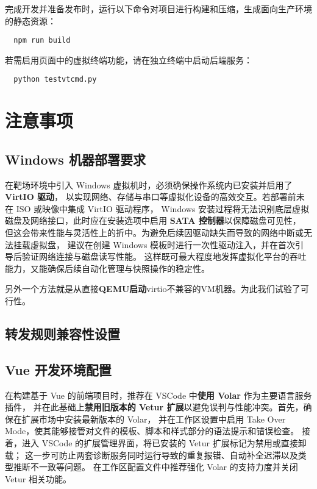 \documentclass[lang=cn,10pt]{elegantbook}
\begin{document}
完成开发并准备发布时，运行以下命令对项目进行构建和压缩，生成面向生产环境的静态资源：
\begin{verbatim}
  npm run build
\end{verbatim}

若需启用页面中的虚拟终端功能，请在独立终端中启动后端服务：
\begin{verbatim}
  python testvtcmd.py
\end{verbatim}





\section{注意事项}

\subsection{Windows 机器部署要求}
在靶场环境中引入 Windows 虚拟机时，必须确保操作系统内已安装并启用了 \textbf{VirtIO 驱动}，
以实现网络、存储与串口等虚拟化设备的高效交互。若部署前未在 ISO 或映像中集成 VirtIO 驱动程序，
Windows 安装过程将无法识别底层虚拟磁盘及网络接口，此时应在安装选项中启用 \textbf{SATA 控制器}以保障磁盘可见性，
但这会带来性能与灵活性上的折中。为避免后续因驱动缺失而导致的网络中断或无法挂载虚拟盘，
建议在创建 Windows 模板时进行一次性驱动注入，并在首次引导后验证网络连接与磁盘读写性能。
这样既可最大程度地发挥虚拟化平台的吞吐能力，又能确保后续自动化管理与快照操作的稳定性。

另外一个方法就是从直接\textbf{QEMU启动}virtio不兼容的VM机器。为此我们试验了可行性。

\subsection{转发规则兼容性设置}

\subsection{Vue 开发环境配置}
在构建基于 Vue 的前端项目时，推荐在 VSCode 中\textbf{使用 Volar} 作为主要语言服务插件，
并在此基础上\textbf{禁用旧版本的 Vetur 扩展}以避免误判与性能冲突。首先，确保在扩展市场中安装最新版本的 Volar，
并在工作区设置中启用 Take Over Mode，使其能够接管对文件的模板、脚本和样式部分的语法提示和错误检查。
接着，进入 VSCode 的扩展管理界面，将已安装的 Vetur 扩展标记为禁用或直接卸载；
这一步可防止两套诊断服务同时运行导致的重复报错、自动补全迟滞以及类型推断不一致等问题。
在工作区配置文件中推荐强化 Volar 的支持力度并关闭 Vetur 相关功能。
\end{document}
